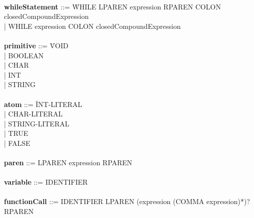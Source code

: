 \begin{tabbing}
\\
{\bf whileStatement}              ::= \=WHILE LPAREN expression RPAREN COLON closedCompoundExpression\\
                                      \>| WHILE expression COLON closedCompoundExpression\\
\\    
{\bf primitive}                   ::= \=VOID\\
                                      \>| BOOLEAN\\
                                      \>| CHAR\\
                                      \>| INT\\
                                      \>| STRING\\
\\ 
{\bf atom}                        ::= \=INT-LITERAL\\
                                      \>| CHAR-LITERAL\\
                                      \>| STRING-LITERAL\\
                                      \>| TRUE\\
                                      \>| FALSE\\
\\ 
{\bf paren}                       ::= LPAREN expression RPAREN\\
\\   
{\bf variable}                    ::= IDENTIFIER \\
\\   
{\bf functionCall}                ::= IDENTIFIER LPAREN (expression (COMMA expression)*)? RPAREN \\

\end{tabbing}

